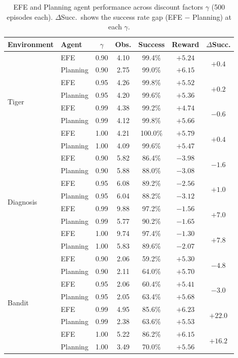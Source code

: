 \documentclass{article}
\begin{document}
\begin{table}[h]
\centering
\caption{EFE and Planning agent performance across discount factors $\gamma$ (500 episodes each). $\Delta$Succ.\ shows the success rate gap (EFE $-$ Planning) at each $\gamma$.}
\label{tab:discount}
\begin{small}
\begin{tabular}{llccccc}
\toprule
Environment & Agent & $\gamma$ & Obs. & Success & Reward & $\Delta$Succ. \\
\midrule
\multirow{8}{*}{Tiger}
& EFE & 0.90 & 4.10 & 99.4\% & $+5.24$ & \multirow{2}{*}{$+0.4$} \\
& Planning & 0.90 & 2.75 & 99.0\% & $+6.15$ & \\
& EFE & 0.95 & 4.26 & 99.8\% & $+5.52$ & \multirow{2}{*}{$+0.2$} \\
& Planning & 0.95 & 4.20 & 99.6\% & $+5.36$ & \\
& EFE & 0.99 & 4.38 & 99.2\% & $+4.74$ & \multirow{2}{*}{$-0.6$} \\
& Planning & 0.99 & 4.12 & 99.8\% & $+5.66$ & \\
& EFE & 1.00 & 4.21 & 100.0\% & $+5.79$ & \multirow{2}{*}{$+0.4$} \\
& Planning & 1.00 & 4.09 & 99.6\% & $+5.47$ & \\
\midrule
\multirow{8}{*}{Diagnosis}
& EFE & 0.90 & 5.82 & 86.4\% & $-3.98$ & \multirow{2}{*}{$-1.6$} \\
& Planning & 0.90 & 5.88 & 88.0\% & $-3.08$ & \\
& EFE & 0.95 & 6.08 & 89.2\% & $-2.56$ & \multirow{2}{*}{$+1.0$} \\
& Planning & 0.95 & 6.04 & 88.2\% & $-3.12$ & \\
& EFE & 0.99 & 9.88 & 97.2\% & $-1.56$ & \multirow{2}{*}{$+7.0$} \\
& Planning & 0.99 & 5.77 & 90.2\% & $-1.65$ & \\
& EFE & 1.00 & 9.74 & 97.4\% & $-1.30$ & \multirow{2}{*}{$+7.8$} \\
& Planning & 1.00 & 5.83 & 89.6\% & $-2.07$ & \\
\midrule
\multirow{8}{*}{Bandit}
& EFE & 0.90 & 2.06 & 59.2\% & $+5.30$ & \multirow{2}{*}{$-4.8$} \\
& Planning & 0.90 & 2.11 & 64.0\% & $+5.70$ & \\
& EFE & 0.95 & 2.06 & 60.4\% & $+5.41$ & \multirow{2}{*}{$-3.0$} \\
& Planning & 0.95 & 2.05 & 63.4\% & $+5.68$ & \\
& EFE & 0.99 & 4.95 & 85.6\% & $+6.23$ & \multirow{2}{*}{$+22.0$} \\
& Planning & 0.99 & 2.38 & 63.6\% & $+5.53$ & \\
& EFE & 1.00 & 5.22 & 86.2\% & $+6.15$ & \multirow{2}{*}{$+16.2$} \\
& Planning & 1.00 & 3.49 & 70.0\% & $+5.56$ & \\
\bottomrule
\end{tabular}
\end{small}
\end{table}
\end{document}
